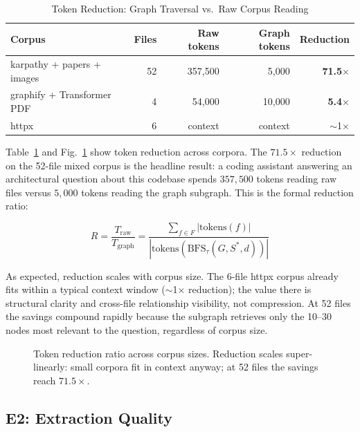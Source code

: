 \begin{table}[h]
\centering
\caption{Token Reduction: Graph Traversal vs.\ Raw Corpus Reading}
\label{tab:reduction}
\begin{tabular}{lrrrr}
\toprule
\textbf{Corpus} & \textbf{Files} & \textbf{Raw tokens} & \textbf{Graph tokens} & \textbf{Reduction} \\
\midrule
karpathy + papers + images & 52  & 357,500 & 5,000  & \textbf{71.5$\times$} \\
graphify + Transformer PDF  & 4   & 54,000  & 10,000 & \textbf{5.4$\times$}  \\
httpx                       & 6   & context & context & $\sim$1$\times$       \\
\bottomrule
\end{tabular}
\end{table}

Table~\ref{tab:reduction} and Fig.~\ref{fig:reduction} show token reduction
across corpora. The $71.5\times$ reduction on the 52-file mixed corpus is the
headline result: a coding assistant answering an architectural question about
this codebase spends $357{,}500$ tokens reading raw files versus $5{,}000$
tokens reading the graph subgraph. This is the formal reduction ratio:

\begin{equation}
  R = \frac{T_\text{raw}}{T_\text{graph}} = \frac{\sum_{f \in F}
  |\text{tokens}(f)|}{|\text{tokens}(\text{BFS}_\tau(G, S^*, d))|}
  \label{eq:reduction}
\end{equation}

As expected, reduction scales with corpus size. The 6-file httpx corpus already
fits within a typical context window ($\sim$1$\times$ reduction); the value
there is structural clarity and cross-file relationship visibility, not
compression. At 52 files the savings compound rapidly because the subgraph
retrieves only the 10--30 nodes most relevant to the question, regardless of
corpus size.

\begin{figure}[h]
  \centering
  
  \caption{Token reduction ratio across corpus sizes. Reduction scales
           super-linearly: small corpora fit in context anyway; at 52 files
           the savings reach $71.5\times$.}
  \label{fig:reduction}
\end{figure}

\subsection{E2: Extraction Quality}

